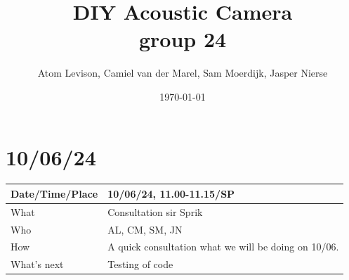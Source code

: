 \documentclass{article}
\title{%
  DIY Acoustic Camera \\
  \Minutes group 24 }
\author{Atom Levison, Camiel van der Marel, Sam Moerdijk, Jasper Nierse}
\date{\today}
\begin{document}
\maketitle

\newpage

\chapter{10/06/24}

\begin{table}[H]
\begin{tabular}{|p{1.5in}|p{4in}|}
\hline
Date/Time/Place &  10/06/24, 11.00-11.15/SP\\ \hline
What            &  Consultation sir Sprik\\ \hline
Who             &  AL, CM, SM, JN\\ \hline
How             &  A quick consultation what we will be doing on 10/06.  \\ \hline
What's next     &  Testing of code\\ \hline
\end{tabular}
\end{table}
\end{document}
